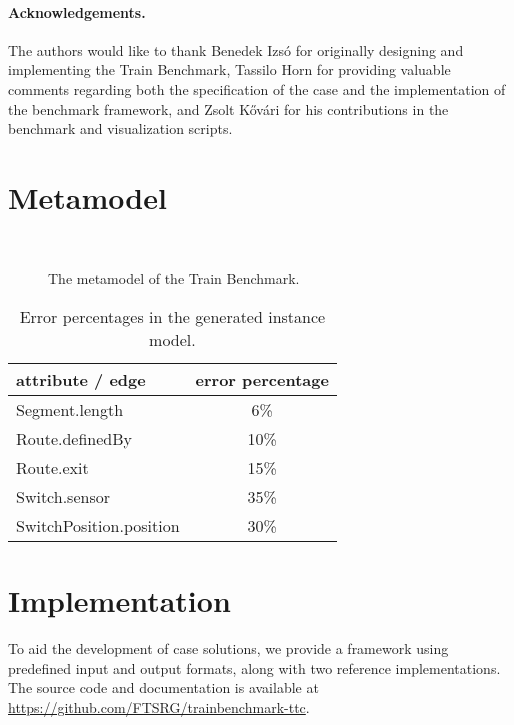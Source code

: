 \documentclass[submission,copyright,creativecommons]{eptcs}
\newcommand{\tb}{Train Benchmark\xspace}
\begin{document}
\paragraph{Acknowledgements.} The authors would like to thank Benedek Izsó for originally designing and implementing the \tb, Tassilo Horn for providing valuable comments regarding both the specification of the case and the implementation of the benchmark framework, and Zsolt Kővári for his contributions in the benchmark and visualization scripts.




\clearpage

\appendix

\section{Metamodel}

\begin{figure}
	\centering
	~
	\caption{The metamodel of the \tb.}
	\label{fig:metamodel}
\end{figure}

\begin{table}
	\centering
	\begin{tabular}{ | l | c | }
		\hline
		\bf attribute / edge & \bf error percentage \\\hline
		\sf Segment.length          & 6\%  \\\hline
		\sf Route.definedBy         & 10\% \\\hline
		\sf Route.exit              & 15\% \\\hline
		\sf Switch.sensor           & 35\% \\\hline
		\sf SwitchPosition.position & 30\% \\\hline
	\end{tabular}
	\caption{Error percentages in the generated instance model.}
	\label{tab:errorpercentages}
\end{table}

\section{Implementation}

To aid the development of case solutions, we provide a framework using predefined input and output formats, along with two reference implementations. The source code and documentation is available at \url{https://github.com/FTSRG/trainbenchmark-ttc}.
\end{document}
